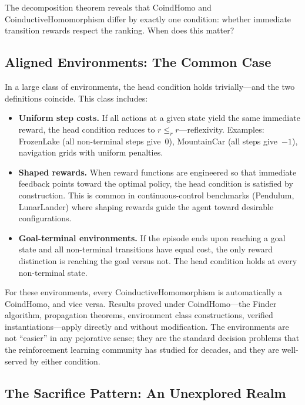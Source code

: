 \documentclass[9pt,a4paper]{article}
\theoremstyle{plain}
\theoremstyle{definition}
\theoremstyle{remark}
\begin{document}
The decomposition theorem reveals that CoindHomo and CoinductiveHomomorphism differ by exactly one condition: whether immediate transition rewards respect the ranking.  When does this matter?

\subsection{Aligned Environments: The Common Case}

In a large class of environments, the head condition holds trivially---and the two definitions coincide.  This class includes:

\begin{itemize}
\item \textbf{Uniform step costs.}  If all actions at a given state yield the same immediate reward, the head condition reduces to $r \le_r r$---reflexivity.  Examples: FrozenLake (all non-terminal steps give~$0$), MountainCar (all steps give~$-1$), navigation grids with uniform penalties.

\item \textbf{Shaped rewards.}  When reward functions are engineered so that immediate feedback points toward the optimal policy, the head condition is satisfied by construction.  This is common in continuous-control benchmarks (Pendulum, LunarLander) where shaping rewards guide the agent toward desirable configurations.

\item \textbf{Goal-terminal environments.}  If the episode ends upon reaching a goal state and all non-terminal transitions have equal cost, the only reward distinction is reaching the goal versus not.  The head condition holds at every non-terminal state.
\end{itemize}

For these environments, every CoinductiveHomomorphism is automatically a CoindHomo, and vice versa.  Results proved under CoindHomo---the Finder algorithm, propagation theorems, environment class constructions, verified instantiations---apply directly and without modification.  The environments are not ``easier'' in any pejorative sense; they are the standard decision problems that the reinforcement learning community has studied for decades, and they are well-served by either condition.

\subsection{The Sacrifice Pattern: An Unexplored Realm}
\end{document}
